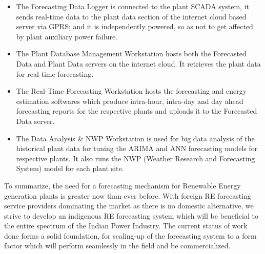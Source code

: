 \begin{itemize}
  \item The Forecasting Data Logger is connected to the plant SCADA system, it sends real-time data to the plant data section of the internet cloud based server via GPRS; and it is independently powered, so as not to get affected by plant auxiliary power failure.
  \item The Plant Database Management Workstation hosts both the Forecasted Data and Plant Data servers on the internet cloud. It retrieves the plant data for real-time forecasting.
  \item The Real-Time Forecasting Workstation hosts the forecasting and energy estimation softwares which produce intra-hour, intra-day and day ahead forecasting reports for the respective plants and uploads it to the Forecasted Data server.
  \item The Data Analysis & NWP Workstation is used for big data analysis of the historical plant data for tuning the ARIMA and ANN forecasting models for respective plants. It also runs the NWP (Weather Research and Forecasting System) model for each plant site.
\end{itemize}

To summarize, the need for a forecasting mechanism for Renewable Energy generation plants is greater now than ever before. With foreign RE forecasting service providers dominating the market as there is no domestic alternative, we strive to develop an indigenous RE forecasting system which will be beneficial to the entire spectrum of the Indian Power Industry. The current status of work done forms a solid foundation, for scaling-up of the forecasting system to a form factor which will perform seamlessly in the field and be commercialized.\\